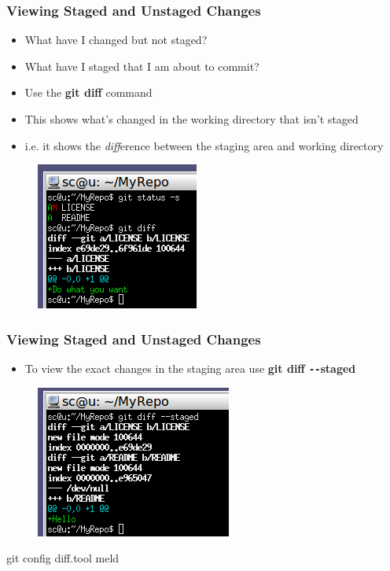 \documentclass{beamer}
\begin{document}
\begin{frame}
	\frametitle{Viewing Staged and Unstaged Changes}
	\begin{itemize}
		\item{What have I changed but not staged?}
		\item{What have I staged that I am about to commit?}
		\item{Use the \textbf{git diff} command}
		\item{This shows what's changed in the working directory that isn't staged}
		\item{i.e. it shows the \textit{diff}erence between the staging area and working directory}
	\end{itemize}
	\begin{figure}
		\includegraphics[scale=0.62]{Viewing_Staged_and_Unstaged_Changes-0.png}
	\end{figure}
\end{frame}

\begin{frame}
	\frametitle{Viewing Staged and Unstaged Changes}
	\begin{itemize}
		\item{To view the exact changes in the staging area use \textbf{git diff \texttt{-{}-}staged}}
	\end{itemize}
	\begin{figure}
		\includegraphics[scale=0.62]{Viewing_Staged_and_Unstaged_Changes-1.png}
	\end{figure}

	\begin{tcolorbox}[colback=green!5,colframe=green!40!black,title=Pro Tip]git config diff.tool meld
	\end{tcolorbox}
\end{frame}
\end{document}
